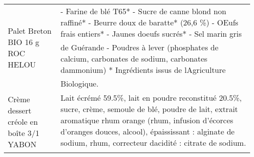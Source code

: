 \begin{longtable}{p{5cm}p{10cm}}
                                                                          Palet Breton BIO 16 g ROC HELOU &                                                                                                                                                                                                                                                                                                                                                                                                                                                                                                                                                                                                                                                                                                                  - Farine de blé T65*  - Sucre de canne blond non raffiné*  - Beurre doux de baratte* (26,6 \%)  - OEufs frais entiers*  - Jaunes doeufs sucrés*  - Sel marin gris de Guérande  - Poudres à lever (phosphates de calcium, carbonates de sodium, carbonates dammonium)  * Ingrédients issus de lAgriculture Biologique. \\
                                                                  Crème dessert créole en boîte 3/1 YABON &                                                                                                                                                                                                                                                                                                                                                                                                                                                                                                                                                                                                                                                                                                                                                                Lait écrémé 59.5\%, lait en poudre reconstitué 20.5\%, sucre, crème, semoule de blé, poudre de lait, extrait aromatique rhum orange (rhum, infusion d'écorces d'oranges douces, alcool), épaississant : alginate de sodium, rhum, correcteur dacidité : citrate de sodium. \\

\end{longtable}
